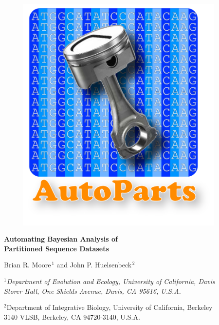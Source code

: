 \documentclass[11pt]{article}
\begin{document}
\begin{titlepage}

\begin{center}
\vfill

\begin{figure}[h] 
\centering 
\includegraphics[height=120mm]{./figures/AutoParts_Logo.png} 
\label{logo}
\end{figure} 

{\huge\bf Automating Bayesian Analysis of\\Partitioned Sequence Datasets}

{\Large \sc Brian R. Moore$^{\,1}$ and John P. Huelsenbeck$^{\,2}$} \\

\medskip

{\em
$\mbox{}^1$Department of Evolution and Ecology, University of California, Davis\\
\vspace{0.4\baselineskip}
Storer Hall, One Shields Avenue, Davis, CA 95616, \mbox{U.S.A.} \\

\smallskip

$\mbox{}^2$Department of Integrative Biology, University of California, Berkeley\\
\vspace{0.4\baselineskip}
3140 VLSB, Berkeley, CA 94720-3140, \mbox{U.S.A.}
}
\vfill
\end{center}




\vfill
\end{titlepage}
\end{document}
